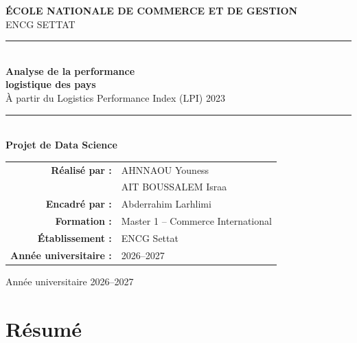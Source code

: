 \documentclass[11pt,a4paper]{article}
\begin{document}

\begin{titlepage}
\centering

\vspace*{1cm}

{\Large \textbf{ÉCOLE NATIONALE DE COMMERCE ET DE GESTION}}\\[0.3cm]
{\large ENCG SETTAT}\\[1.5cm]

{\color{navy}\rule{\textwidth}{1.5pt}}\\[0.5cm]

{\Huge\bfseries Analyse de la performance}\\[0.2cm]
{\Huge\bfseries logistique des pays}\\[0.5cm]

{\Large À partir du Logistics Performance Index (LPI) 2023}\\[0.5cm]

{\color{navy}\rule{\textwidth}{1.5pt}}\\[1.5cm]

{\Large \textbf{Projet de Data Science}}\\[1cm]

\begin{tabular}{rl}
\textbf{Réalisé par :} & AHNNAOU Youness\\
                       & AIT BOUSSALEM Israa\\[0.5cm]
\textbf{Encadré par :} & Abderrahim Larhlimi\\[0.3cm]
\textbf{Formation :} & Master 1 -- Commerce International\\[0.3cm]
\textbf{Établissement :} & ENCG Settat\\[0.3cm]
\textbf{Année universitaire :} & 2026--2027\\
\end{tabular}

\vfill

{\large Année universitaire 2026--2027}

\end{titlepage}



\section*{Résumé}
\end{document}
